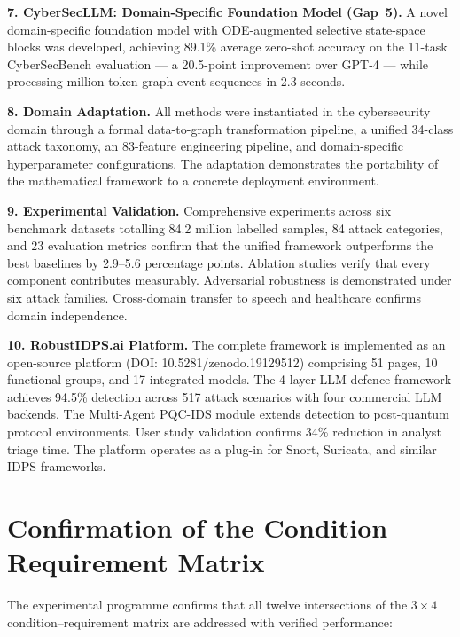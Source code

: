 \noindent\textbf{7. CyberSecLLM: Domain-Specific Foundation Model (Gap~5).}
A novel domain-specific foundation model with ODE-augmented selective state-space blocks was developed, achieving 89.1\% average zero-shot accuracy on the 11-task CyberSecBench evaluation --- a 20.5-point improvement over GPT-4 --- while processing million-token graph event sequences in 2.3 seconds.

\noindent\textbf{8. Domain Adaptation.}
All methods were instantiated in the cybersecurity domain through a formal data-to-graph transformation pipeline, a unified 34-class attack taxonomy, an 83-feature engineering pipeline, and domain-specific hyperparameter configurations. The adaptation demonstrates the portability of the mathematical framework to a concrete deployment environment.

\noindent\textbf{9. Experimental Validation.}
Comprehensive experiments across six benchmark datasets totalling 84.2 million labelled samples, 84 attack categories, and 23 evaluation metrics confirm that the unified framework outperforms the best baselines by 2.9--5.6 percentage points. Ablation studies verify that every component contributes measurably. Adversarial robustness is demonstrated under six attack families. Cross-domain transfer to speech and healthcare confirms domain independence.

\noindent\textbf{10. RobustIDPS.ai Platform.}
The complete framework is implemented as an open-source platform (DOI: 10.5281/zenodo.19129512) comprising 51 pages, 10 functional groups, and 17 integrated models. The 4-layer LLM defence framework achieves 94.5\% detection across 517 attack scenarios with four commercial LLM backends. The Multi-Agent PQC-IDS module extends detection to post-quantum protocol environments. User study validation confirms 34\% reduction in analyst triage time. The platform operates as a plug-in for Snort, Suricata, and similar IDPS frameworks.

\section*{Confirmation of the Condition--Requirement Matrix}

The experimental programme confirms that all twelve intersections of the $3\times4$ condition--requirement matrix are addressed with verified performance:

